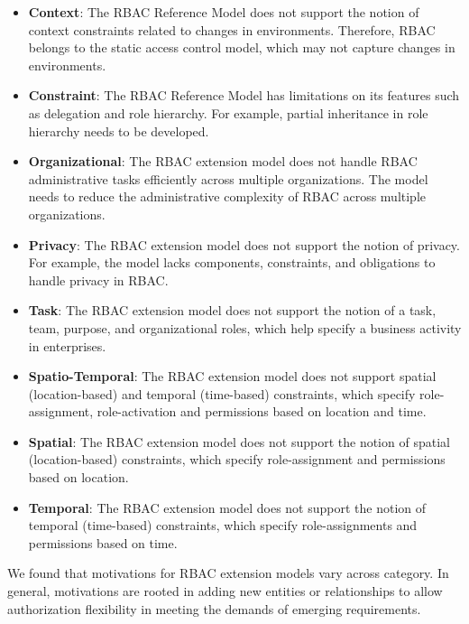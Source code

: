 \begin{itemize}

  \item \textbf{Context}: The RBAC Reference Model does not support the notion of context constraints related to changes in environments. Therefore, RBAC belongs to the static access control model, which may not capture changes in environments.
 
  \item \textbf{Constraint}: The RBAC Reference Model has limitations on its features such as delegation and role hierarchy. For example, partial inheritance in role hierarchy needs to be developed.
  
  \item \textbf{Organizational}: The RBAC extension model does not handle RBAC administrative tasks efficiently across multiple organizations. The model needs to reduce the administrative complexity of RBAC across multiple organizations.
   
  \item \textbf{Privacy}: The RBAC extension model does not support the notion of privacy. For example, the model lacks components, constraints, and obligations to handle privacy in RBAC.
  
  \item \textbf{Task}: The RBAC extension model does not support the notion of a task, team, purpose, and organizational roles, which help specify a business activity in enterprises.
    
  \item \textbf{Spatio-Temporal}: The RBAC extension model does not support spatial (location-based) and temporal (time-based) constraints, which specify role-assignment, role-activation and permissions based on location and time.
  
  \item \textbf{Spatial}: The RBAC extension model does not support the notion of spatial (location-based)  constraints, which specify role-assignment and permissions based on location.
        
  \item \textbf{Temporal}: The RBAC extension model does not support the notion of temporal (time-based)  constraints, which specify role-assignments and permissions based on time.
      
\end{itemize}
 
We found that motivations for RBAC extension models vary across category. In general, motivations are rooted in adding new entities or relationships to allow authorization flexibility in meeting the demands of emerging requirements.

